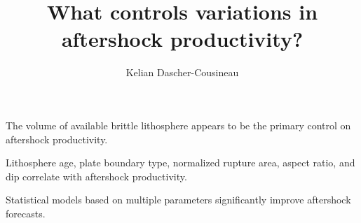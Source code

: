 \documentclass[draft, jgrga]{agujournal2018}
\author{Kelian Dascher-Cousineau}
\begin{document}
\large
\title{What controls variations in aftershock productivity?}













\begin{keypoints}
\item The volume of available brittle lithosphere appears to be the primary control on aftershock productivity.
\item Lithosphere age, plate boundary type, normalized rupture area, aspect ratio, and dip  correlate with aftershock productivity.
\item Statistical models based on multiple parameters significantly improve aftershock forecasts.
\end{keypoints}
\end{document}
